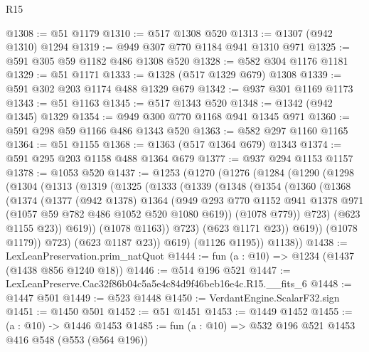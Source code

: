 \begin{lexlean}{R15}
\begin{coremodule}
@1308 := @51 @1179
@1310 := @517 @1308 @520
@1313 := @1307 (@942 @1310) @1294
@1319 := @949 @307 @770 @1184 @941 @1310 @971
@1325 := @591 @305 @59 @1182 @486 @1308 @520
@1328 := @582 @304 @1176 @1181
@1329 := @51 @1171
@1333 := @1328 (@517 @1329 @679) @1308
@1339 := @591 @302 @203 @1174 @488 @1329 @679
@1342 := @937 @301 @1169 @1173
@1343 := @51 @1163
@1345 := @517 @1343 @520
@1348 := @1342 (@942 @1345) @1329
@1354 := @949 @300 @770 @1168 @941 @1345 @971
@1360 := @591 @298 @59 @1166 @486 @1343 @520
@1363 := @582 @297 @1160 @1165
@1364 := @51 @1155
@1368 := @1363 (@517 @1364 @679) @1343
@1374 := @591 @295 @203 @1158 @488 @1364 @679
@1377 := @937 @294 @1153 @1157
@1378 := @1053 @520
@1437 := @1253
    (@1270
      (@1276
        (@1284
          (@1290
            (@1298
              (@1304
                (@1313
                  (@1319
                    (@1325
                      (@1333
                        (@1339
                          (@1348
                            (@1354
                              (@1360
                                (@1368
                                  (@1374
                                    (@1377
                                      (@942 @1378)
                                      @1364
                                      (@949
                                        @293
                                        @770
                                        @1152
                                        @941
                                        @1378
                                        @971
                                        (@1057 @59 @782 @486 @1052 @520 @1080 @619))
                                      (@1078 @779))
                                    @723)
                                  (@623 @1155 @23))
                                @619))
                            (@1078 @1163))
                          @723)
                        (@623 @1171 @23))
                      @619))
                  (@1078 @1179))
                @723)
              (@623 @1187 @23))
            @619)
          (@1126 @1195))
        @1138))
@1438 := LexLeanPreservation.prim_natQuot
@1444 := fun (a : @10) => @1234 (@1437 (@1438 @856 @1240 @18))
@1446 := @514 @196 @521
@1447 := LexLeanPreserve.Cac32f86b04c5a5e4c84d9f46beb16e4c.R15.__fits_6
@1448 := @1447 @501
@1449 := @523 @1448
@1450 := VerdantEngine.ScalarF32.sign
@1451 := @1450 @501
@1452 := @51 @1451
@1453 := @1449 @1452
@1455 := (a : @10) -> @1446 @1453
@1485 := fun (a : @10) =>
  @532
    @196
    @521
    @1453
    @416
    @548
    (@553 (@564 @196))

\end{coremodule}
\end{lexlean}
